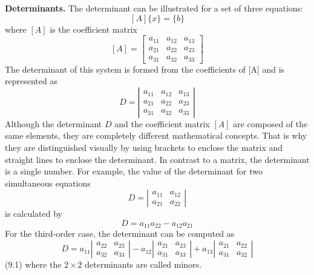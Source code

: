 \documentclass[../main.tex]{subfiles}
\begin{document}
\textbf{Determinants.} The determinant can be illustrated for a set of three equations:
$$
[A]\{x\}=\{b\}
$$
where $[A]$ is the coefficient matrix
$$
[A]=\left[\begin{array}{lll}
a_{11} & a_{12} & a_{13} \\
a_{21} & a_{22} & a_{23} \\
a_{31} & a_{32} & a_{33}
\end{array}\right]
$$
The determinant of this system is formed from the coefficients of [A] and is represented as
$$
D=\left|\begin{array}{lll}
a_{11} & a_{12} & a_{13} \\
a_{21} & a_{22} & a_{23} \\
a_{31} & a_{32} & a_{33}
\end{array}\right|
$$
Although the determinant $D$ and the coefficient matrix $[A]$ are composed of the same elements, they are completely different mathematical concepts. That is why they are distinguished visually by using brackets to enclose the matrix and straight lines to enclose the determinant. In contrast to a matrix, the determinant is a single number. For example, the value of the determinant for two simultaneous equations
$$
D=\left|\begin{array}{ll}
a_{11} & a_{12} \\
a_{21} & a_{22}
\end{array}\right|
$$
is calculated by
$$
D=a_{11} a_{22}-a_{12} a_{21}
$$
For the third-order case, the determinant can be computed as
$$
D=a_{11}\left|\begin{array}{ll}
a_{22} & a_{23} \\
a_{32} & a_{33}
\end{array}\right|-a_{12}\left|\begin{array}{ll}
a_{21} & a_{23} \\
a_{31} & a_{33}
\end{array}\right|+a_{13}\left|\begin{array}{ll}
a_{21} & a_{22} \\
a_{31} & a_{32}
\end{array}\right|
$$\hfill{(9.1)}
where the $2 \times 2$ determinants are called minors.
\end{document}
